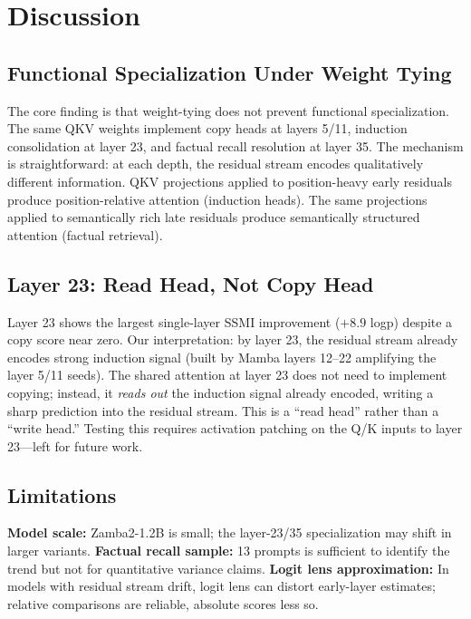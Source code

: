 \documentclass[11pt,a4paper]{article}
\begin{document}
\section{Discussion}

\subsection{Functional Specialization Under Weight Tying}

The core finding is that weight-tying does not prevent functional specialization. The same QKV weights implement copy heads at layers 5/11, induction consolidation at layer 23, and factual recall resolution at layer 35. The mechanism is straightforward: at each depth, the residual stream encodes qualitatively different information. QKV projections applied to position-heavy early residuals produce position-relative attention (induction heads). The same projections applied to semantically rich late residuals produce semantically structured attention (factual retrieval).

\subsection{Layer 23: Read Head, Not Copy Head}

Layer 23 shows the largest single-layer SSMI improvement ($+8.9$ logp) despite a copy score near zero. Our interpretation: by layer 23, the residual stream already encodes strong induction signal (built by Mamba layers 12--22 amplifying the layer 5/11 seeds). The shared attention at layer 23 does not need to implement copying; instead, it \emph{reads out} the induction signal already encoded, writing a sharp prediction into the residual stream. This is a ``read head'' rather than a ``write head.'' Testing this requires activation patching on the Q/K inputs to layer 23---left for future work.

\subsection{Limitations}

\textbf{Model scale:} Zamba2-1.2B is small; the layer-23/35 specialization may shift in larger variants.
\textbf{Factual recall sample:} 13 prompts is sufficient to identify the trend but not for quantitative variance claims.
\textbf{Logit lens approximation:} In models with residual stream drift, logit lens can distort early-layer estimates; relative comparisons are reliable, absolute scores less so.
\end{document}
